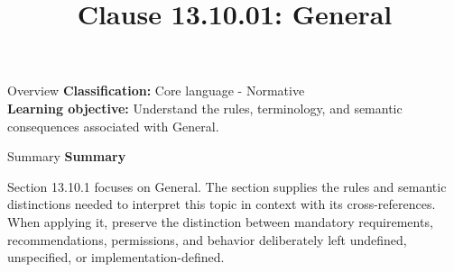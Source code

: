 \documentclass[10pt,letterpaper]{article}
\title{Clause 13.10.01: General}
\author{}
\date{}
\begin{document}
\maketitle
\begin{CornellOverviewBox}{Overview}
\textbf{Classification:} Core language - Normative\\[2pt]
\textbf{Learning objective:} Understand the rules, terminology, and semantic consequences associated with General.
\end{CornellOverviewBox}\begin{CornellSummaryBox}{Summary}
{\sffamily\bfseries\color{Accent} Summary}\par\vspace{3pt}Section 13.10.1 focuses on General. The section supplies the rules and semantic distinctions needed to interpret this topic in context with its cross-references. When applying it, preserve the distinction between mandatory requirements, recommendations, permissions, and behavior deliberately left undefined, unspecified, or implementation-defined.
\end{CornellSummaryBox}
\end{document}
